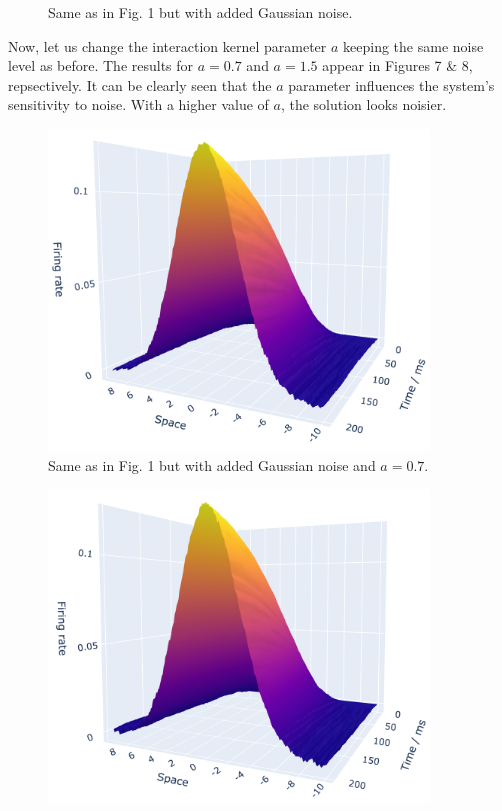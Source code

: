 \documentclass[12pt]{article}
\begin{document}
\begin{enumerate}
\begin{figure}[H]
    \caption{Same as in Fig. 1 but with added Gaussian noise.}
\end{figure}
Now, let us change the interaction kernel parameter $a$ keeping the same noise level as before. The results for $a=0.7$
and $a=1.5$ appear in Figures 7 \& 8, repsectively. It can be clearly seen that the $a$ parameter influences the system's 
sensitivity to noise. With a higher value of $a$, the solution looks noisier. 
\begin{figure}[H]
    \centering
    \includegraphics[width=0.9\textwidth]{./figure7.png}
    \caption{Same as in Fig. 1 but with added Gaussian noise and $a=0.7$.}
\end{figure}
\begin{figure}[H]
    \centering
    \includegraphics[width=0.9\textwidth]{./figure8.png}

\end{figure}
\end{enumerate}
\end{document}
